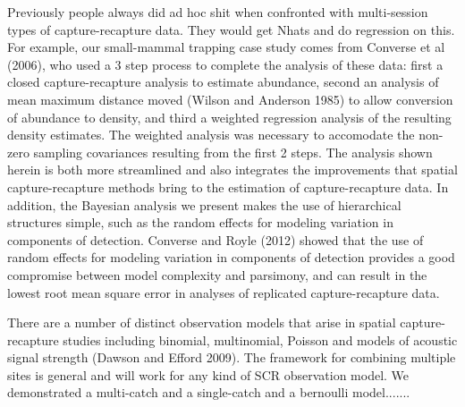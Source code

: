 Previously people always did ad hoc shit when confronted with
multi-session types of capture-recapture data. They would get Nhats
and do regression on this. For example, 
our small-mammal trapping case study comes from 
Converse et al (2006), who used
a 3 step process to complete the analysis of these data: first a
closed capture-recapture analysis to estimate abundance, second an
analysis of mean maximum distance moved (Wilson and Anderson 1985) to
allow conversion of abundance to density, and third a weighted
regression analysis of the  resulting density estimates. The
weighted analysis was necessary to accomodate the non-zero sampling
covariances resulting from the first 2 steps. The analysis shown
herein is both more streamlined and also integrates the improvements
that spatial capture-recapture methods bring to the estimation of
capture-recapture data. In addition, the Bayesian analysis we present
makes the use of hierarchical structures simple, such as the random effects
for modeling variation in components of detection. Converse
and Royle (2012) showed that the use of random effects for modeling
variation in components of detection provides a good compromise
between model complexity and parsimony, and can result in the lowest root
mean square error in analyses of replicated capture-recapture data.








There are a number of distinct observation models that arise in
spatial capture-recapture studies including binomial, multinomial,
Poisson and models of acoustic signal strength (Dawson and Efford
2009).  The framework for combining multiple sites is general and will
work for any kind of SCR observation model.
We demonstrated a multi-catch and a single-catch and a bernoulli
model.......








